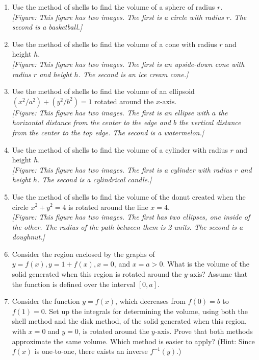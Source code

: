 \documentclass{exercises}
\begin{document}
\begin{enumerate}[resume]
\item Use the method of shells to find the volume of a sphere of radius $r$. \\ \textit{[Figure: This figure has two images. The first is a circle with radius $r$. The second is a basketball.]}
\item Use the method of shells to find the volume of a cone with radius $r$ and height $h$. \\ \textit{[Figure: This figure has two images. The first is an upside-down cone with radius $r$ and height $h$. The second is an ice cream cone.]}
\item Use the method of shells to find the volume of an ellipsoid $(x^{2}/a^{2})+(y^{2}/b^{2})=1$ rotated around the $x\text{-axis}$. \\ \textit{[Figure: This figure has two images. The first is an ellipse with $a$ the horizontal distance from the center to the edge and $b$ the vertical distance from the center to the top edge. The second is a watermelon.]}
\item Use the method of shells to find the volume of a cylinder with radius $r$ and height $h$. \\ \textit{[Figure: This figure has two images. The first is a cylinder with radius $r$ and height $h$. The second is a cylindrical candle.]}
\item Use the method of shells to find the volume of the donut created when the circle $x^{2}+y^{2}=4$ is rotated around the line $x=4$. \\ \textit{[Figure: This figure has two images. The first has two ellipses, one inside of the other. The radius of the path between them is 2 units. The second is a doughnut.]}
\item Consider the region enclosed by the graphs of $y=f(x),y=1+f(x),x=0$, and $x=a>0$. What is the volume of the solid generated when this region is rotated around the $y\text{-axis}$? Assume that the function is defined over the interval $[0,a]$.
\item Consider the function $y=f(x)$, which decreases from $f(0)=b$ to $f(1)=0$. Set up the integrals for determining the volume, using both the shell method and the disk method, of the solid generated when this region, with $x=0$ and $y=0$, is rotated around the $y\text{-axis}$. Prove that both methods approximate the same volume. Which method is easier to apply? (Hint: Since $f(x)$ is one-to-one, there exists an inverse $f^{-1}(y)$.)
\end{enumerate}
\end{document}
